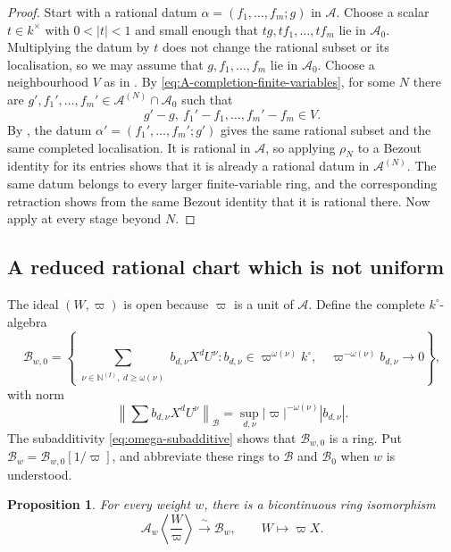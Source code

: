 \documentclass[11pt,reqno]{amsart}
\newtheorem{proposition}[proposition]{Proposition}
\theoremstyle{definition}
\begin{document}
\begin{proof}
Start with a rational datum
$\alpha=(f_1,\ldots,f_m;g)$ in $\mathcal A$.  Choose a scalar
$t\in k^\times$ with $0<|t|<1$ and small enough that
$tg,tf_1,\ldots,tf_m$ lie in $\mathcal A_0$.  Multiplying the datum by
$t$ does not change the rational subset or its localisation, so we may
assume that $g,f_1,\ldots,f_m$ lie in $\mathcal A_0$.  Choose a
neighbourhood $V$ as in .  By
\eqref{eq:A-completion-finite-variables}, for some $N$ there are
$g',f_1',\ldots,f_m'\in\mathcal A^{(N)}\cap\mathcal A_0$ such that
\[
  g'-g,\ f_1'-f_1,\ldots,f_m'-f_m\in V.
\]
By , the datum
$\alpha'=(f_1',\ldots,f_m';g')$ gives the same rational subset and the same
completed localisation.  It is rational in $\mathcal A$, so applying
$\rho_N$ to a Bezout identity for its entries shows that it is already a
rational datum in $\mathcal A^{(N)}$.  The same datum belongs to every larger
finite-variable ring, and the corresponding retraction shows from the same
Bezout identity that it is rational there.  Now apply
 at every stage beyond $N$.
\end{proof}

\subsection{A reduced rational chart which is not uniform}

The ideal $(W,\varpi)$ is open because $\varpi$ is a unit of $\mathcal A$.
Define the complete $k^\circ$-algebra
\begin{equation}\label{eq:weighted-chart-ring}
  \mathcal B_{w,0}=
  \left\{
    \sum_{\substack{\nu\in\mathbb N^{(I)},\ d\geq\omega(\nu)}}
      b_{d,\nu}X^dU^\nu:
    b_{d,\nu}\in\varpi^{\omega(\nu)}k^\circ,
    \quad
    \varpi^{-\omega(\nu)}b_{d,\nu}\longrightarrow0
  \right\},
\end{equation}
with norm
\begin{equation}\label{eq:weighted-chart-norm}
  \left\lVert\sum b_{d,\nu}X^dU^\nu\right\rVert_{\mathcal B}
  =\sup_{d,\nu}|\varpi|^{-\omega(\nu)}|b_{d,\nu}|.
\end{equation}
The subadditivity \eqref{eq:omega-subadditive} shows that $\mathcal B_{w,0}$
is a ring.  Put $\mathcal B_w=\mathcal B_{w,0}[1/\varpi]$, and abbreviate
these rings to $\mathcal B$ and $\mathcal B_0$ when $w$ is understood.

\begin{proposition}\label{prop:weighted-chart-identification}
For every weight $w$, there is a bicontinuous ring isomorphism
\[
  \mathcal A_w\left\langle\frac{W}{\varpi}\right\rangle
  \xrightarrow{\ \sim\ }\mathcal B_w,
  \qquad W\longmapsto\varpi X.
\]
\end{proposition}
\end{document}
